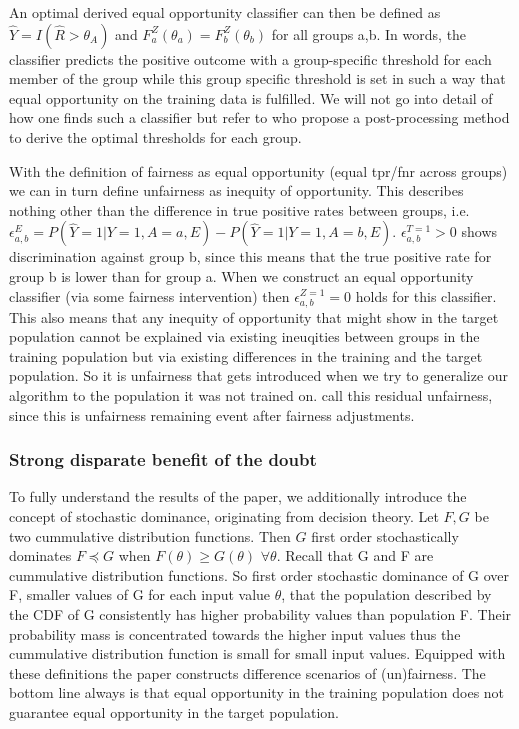 An optimal derived equal opportunity classifier can then be defined as $\hat{Y} = I(\hat{R} > \theta_A)$ and $F_a^Z(\theta_a) = F_b^Z(\theta_b)$ for all groups a,b. In words, the classifier predicts the positive outcome with a group-specific threshold for each member of the group while this group specific threshold is set in such a way that equal opportunity on the training data is fulfilled. We will not go into detail of how one finds such a classifier but refer to \cite{hardt2016} who propose a post-processing method to derive the optimal thresholds for each group. 

With the definition of fairness as equal opportunity (equal tpr/fnr across groups) we can in turn define unfairness as inequity of opportunity. This describes nothing other than the difference in true positive rates between groups, i.e. \(\epsilon_{a,b}^E = P(\hat{Y} = 1 | Y = 1, A = a, E) - P(\hat{Y} = 1 | Y = 1, A = b, E)\). $\epsilon_{a,b}^{T=1} > 0$ shows discrimination against group b, since this means that the true positive rate for group b is lower than for group a.
When we construct an equal opportunity classifier (via some fairness intervention) then $\epsilon_{a,b}^{Z=1} = 0$ holds for this classifier. This also means that any inequity of opportunity that might show in the target population cannot be explained via existing ineuqities between groups in the training population but via existing differences in the training and the target population. So it is unfairness that gets introduced when we try to generalize our algorithm to the population it was not trained on. \cite{kallus} call this residual unfairness, since this is unfairness remaining event after fairness adjustments.

\subsubsection*{Strong disparate benefit of the doubt}
To fully understand the results of the paper, we additionally introduce the concept of stochastic dominance, originating from decision theory. Let $F, G$ be two cummulative distribution functions. Then $G$ first order stochastically dominates $F \preceq G$ when $F(\theta) \geq G(\theta)$ $\forall\theta$. Recall that G and F are cummulative distribution functions. So first order stochastic dominance of G over F, smaller values of G for each input value $\theta$, that the population described by the CDF of G consistently has higher probability values than population F. Their probability mass is concentrated towards the higher input values thus the cummulative distribution function is small for small input values.
Equipped with these definitions the paper constructs difference scenarios of (un)fairness. The bottom line always is that equal opportunity in the training population does not guarantee equal opportunity in the target population.

